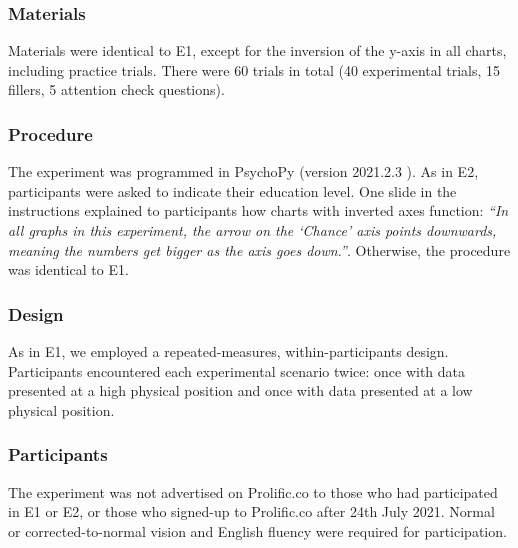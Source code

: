 \documentclass[journal]{vgtc}                %
\begin{document}
\hypertarget{materials-2}{%
\subsubsection{Materials}\label{materials-2}}

Materials were identical to E1, except for the inversion of the y-axis
in all charts, including practice trials. There were 60 trials in total
(40 experimental trials, 15 fillers, 5 attention check questions).

\hypertarget{procedure-2}{%
\subsubsection{Procedure}\label{procedure-2}}

The experiment was programmed in PsychoPy (version 2021.2.3 \citet{peirce_psychopy2_2019}). As in E2, participants were asked to indicate their education level. One
slide in the instructions explained to participants how charts with
inverted axes function: \emph{``In all graphs in this experiment, the arrow on
the `Chance' axis points downwards, meaning the numbers get bigger as
the axis goes down.''}. Otherwise, the procedure was identical to E1.

\hypertarget{design-2}{%
\subsubsection{Design}\label{design-2}}

As in E1, we employed a repeated-measures, within-participants design.
Participants encountered each experimental scenario twice: once with
data presented at a high physical position and once with data presented
at a low physical position.

\hypertarget{participants-2}{%
\subsubsection{Participants}\label{participants-2}}

The experiment was not advertised on Prolific.co to those who had
participated in E1 or E2, or those who signed-up to Prolific.co after
24th July 2021. Normal or corrected-to-normal vision and English fluency
were required for participation.
\end{document}
